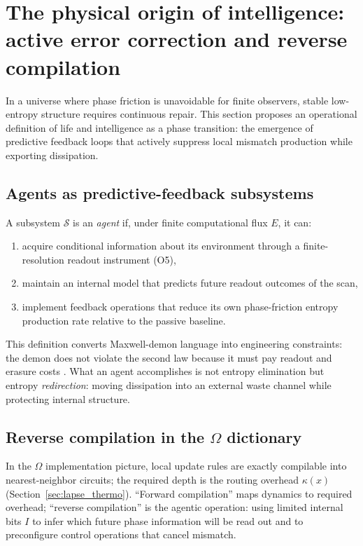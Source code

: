 \section{The physical origin of intelligence: active error correction and reverse compilation}
\label{sec:intelligence}

In a universe where phase friction is unavoidable for finite observers, stable low-entropy structure requires continuous repair. This section proposes an operational definition of life and intelligence as a phase transition: the emergence of predictive feedback loops that actively suppress local mismatch production while exporting dissipation.

\subsection{Agents as predictive-feedback subsystems}

\begin{definition}[Agent]
\label{def:agent}
A subsystem $\mathcal{S}$ is an \emph{agent} if, under finite computational flux $E$, it can:
\begin{enumerate}
  \item acquire conditional information about its environment through a finite-resolution readout instrument (O5),
  \item maintain an internal model that predicts future readout outcomes of the scan,
  \item implement feedback operations that reduce its own phase-friction entropy production rate relative to the passive baseline.
\end{enumerate}
\end{definition}

\noindent This definition converts Maxwell-demon language into engineering constraints: the demon does not violate the second law because it must pay readout and erasure costs \cite{Szilard1929,Landauer1961,Bennett1973}. What an agent accomplishes is not entropy elimination but entropy \emph{redirection}: moving dissipation into an external waste channel while protecting internal structure.

\subsection{Reverse compilation in the \texorpdfstring{$\Omega$}{Omega} dictionary}

In the $\Omega$ implementation picture, local update rules are exactly compilable into nearest-neighbor circuits; the required depth is the routing overhead $\kappa(x)$ (Section~\ref{sec:lapse_thermo}). ``Forward compilation'' maps dynamics to required overhead; ``reverse compilation'' is the agentic operation: using limited internal bits $I$ to infer which future phase information will be read out and to preconfigure control operations that cancel mismatch.

